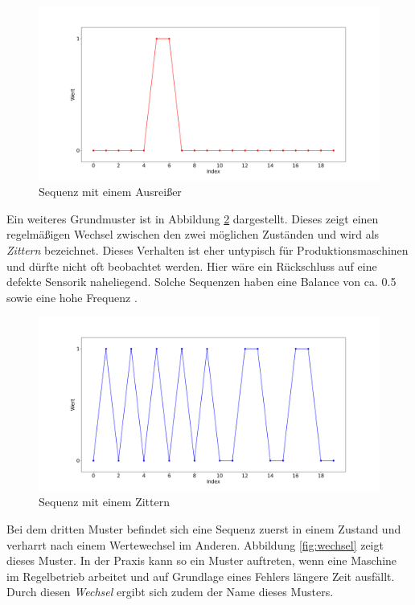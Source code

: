 \begin{figure}[H]
	\centering
	\includegraphics[scale=0.32]{images/Klassifizierung/ausreisser}
	\caption{Sequenz mit einem Ausreißer}
	\label{fig:ausreisser}
\end{figure}

Ein weiteres Grundmuster ist in Abbildung \ref{fig:zittern} dargestellt. Dieses zeigt einen regelmäßigen Wechsel zwischen den zwei möglichen Zuständen und wird als \textit{Zittern} bezeichnet. Dieses Verhalten ist eher untypisch für Produktionsmaschinen und dürfte nicht oft beobachtet werden. Hier wäre ein Rückschluss auf eine defekte Sensorik naheliegend. Solche Sequenzen haben eine Balance von ca. 0.5 sowie eine hohe Frequenz .

\begin{figure}[H]
	\centering
	\includegraphics[scale=0.32]{images/Klassifizierung/zittern}
	\caption{Sequenz mit einem Zittern}
	\label{fig:zittern}
\end{figure}

Bei dem dritten Muster befindet sich eine Sequenz zuerst in einem Zustand und verharrt nach einem Wertewechsel im Anderen. Abbildung \ref{fig:wechsel} zeigt dieses Muster. In der Praxis kann so ein Muster auftreten, wenn eine Maschine im Regelbetrieb arbeitet und auf Grundlage eines Fehlers längere Zeit ausfällt. Durch diesen \textit{Wechsel} ergibt sich zudem der Name dieses Musters.

